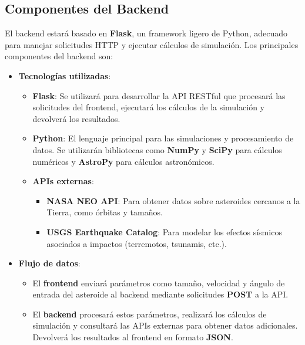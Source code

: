 \documentclass[conference]{IEEEtran}
\begin{document}
\subsection{Componentes del Backend}
El backend estará basado en \textbf{Flask}, un framework ligero de Python, adecuado para
manejar solicitudes HTTP y ejecutar cálculos de simulación. Los principales
componentes del backend son:
\begin{itemize}
	\item \textbf{Tecnologías utilizadas}:
	      \begin{itemize}
		      \item \textbf{Flask}: Se utilizará para desarrollar la API RESTful que
		            procesará las solicitudes del frontend, ejecutará los cálculos de
		            la simulación y devolverá los resultados.
		      \item \textbf{Python}: El lenguaje principal para las simulaciones y
		            procesamiento de datos. Se utilizarán bibliotecas como \textbf{NumPy} y
		            \textbf{SciPy} para cálculos numéricos y \textbf{AstroPy} para cálculos astronómicos.
		      \item \textbf{APIs externas}:
		            \begin{itemize}
			            \item \textbf{NASA NEO API}: Para obtener datos sobre asteroides
			                  cercanos a la Tierra, como órbitas y tamaños.
			            \item \textbf{USGS Earthquake Catalog}: Para modelar los efectos
			                  sísmicos asociados a impactos (terremotos, tsunamis, etc.).
		            \end{itemize}
	      \end{itemize}
	\item \textbf{Flujo de datos}:
	      \begin{itemize}
		      \item El \textbf{frontend} enviará parámetros como tamaño,
		            velocidad y ángulo de entrada del asteroide al backend mediante
		            solicitudes \textbf{POST} a la API.
		      \item El \textbf{backend} procesará estos parámetros, realizará los
		            cálculos de simulación y consultará las APIs externas para obtener
		            datos adicionales. Devolverá los resultados al frontend en formato \textbf{JSON}.
	      \end{itemize}
\end{itemize}
\end{document}
